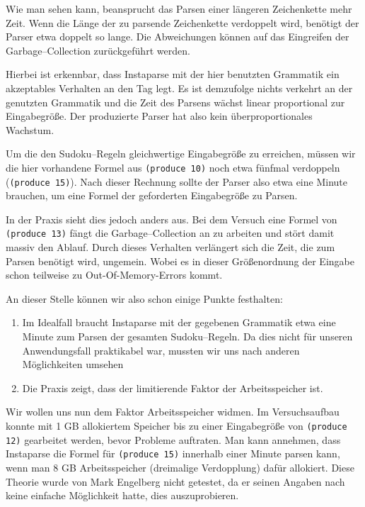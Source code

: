 \documentclass[ngerman,a4paper,abstracton,open=right,twoside=false,toc=listofnumbered,bibtotocnumbered]{scrreprt}
\begin{document}
Wie man sehen kann, beansprucht das Parsen einer längeren Zeichenkette mehr Zeit. Wenn die Länge der zu parsende Zeichenkette verdoppelt wird, benötigt der Parser etwa doppelt so lange. Die Abweichungen können auf das Eingreifen der Garbage--Collection zurückgeführt werden.

Hierbei ist erkennbar, dass Instaparse mit der hier benutzten Grammatik ein akzeptables Verhalten an den Tag legt. Es ist demzufolge nichts verkehrt an der genutzten Grammatik und die Zeit des Parsens wächst linear proportional zur Eingabegröße. Der produzierte Parser hat also kein überproportionales Wachstum.

Um die den Sudoku--Regeln gleichwertige Eingabegröße zu erreichen, müssen wir die hier vorhandene Formel aus \lstinline|(produce 10)| noch etwa fünfmal verdoppeln (\lstinline|(produce 15)|). Nach dieser Rechnung sollte der Parser also etwa eine Minute brauchen, um eine Formel der geforderten Eingabegröße zu Parsen.

In der Praxis sieht dies jedoch anders aus. Bei dem Versuch eine Formel von \lstinline|(produce 13)| fängt die Garbage--Collection an zu arbeiten und stört damit massiv den Ablauf. Durch dieses Verhalten verlängert sich die Zeit, die zum Parsen benötigt wird, ungemein. Wobei es in dieser Größenordnung der Eingabe schon teilweise zu Out-Of-Memory-Errors kommt.

An dieser Stelle können wir also schon einige Punkte festhalten:

\begin{enumerate}
	\item Im Idealfall braucht Instaparse mit der gegebenen Grammatik etwa eine Minute zum Parsen der gesamten Sudoku--Regeln. Da dies nicht für unseren Anwendungsfall praktikabel war, mussten wir uns nach anderen Möglichkeiten umsehen
	\item Die Praxis zeigt, dass der limitierende Faktor der Arbeitsspeicher ist.
\end{enumerate}

Wir wollen uns nun dem Faktor Arbeitsspeicher widmen. Im Versuchsaufbau konnte mit 1 GB allokiertem Speicher bis zu einer Eingabegröße von \lstinline|(produce 12)| gearbeitet werden, bevor Probleme auftraten. Man kann annehmen, dass Instaparse die Formel für \lstinline|(produce 15)| innerhalb einer Minute parsen kann, wenn man 8 GB Arbeitsspeicher (dreimalige Verdopplung) dafür allokiert. Diese Theorie wurde von Mark Engelberg nicht getestet, da er seinen Angaben nach keine einfache Möglichkeit hatte, dies auszuprobieren.\\
\end{document}

